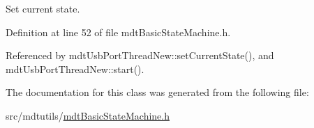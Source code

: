Set current state. 



Definition at line 52 of file mdt\-Basic\-State\-Machine.\-h.



Referenced by mdt\-Usb\-Port\-Thread\-New\-::set\-Current\-State(), and mdt\-Usb\-Port\-Thread\-New\-::start().



The documentation for this class was generated from the following file\-:\begin{DoxyCompactItemize}
\item 
src/mdtutils/\hyperlink{mdt_basic_state_machine_8h}{mdt\-Basic\-State\-Machine.\-h}\end{DoxyCompactItemize}
